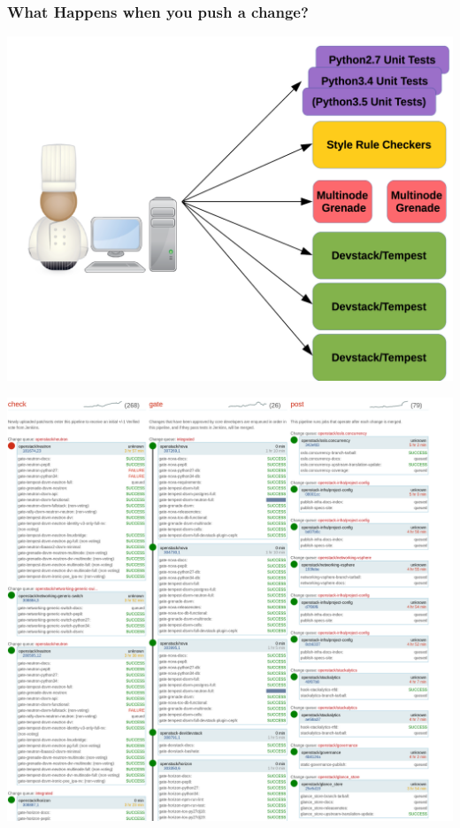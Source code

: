 \documentclass[aspectratio=169,11pt,hyperref={colorlinks=true}]{beamer}
\begin{document}
\begin{frame}
\frametitle{What Happens when you push a change?}
\begin{center}
	\includegraphics[width=.7\textwidth]{jobs.png}
\end{center}
\end{frame}

\begin{frame}
\begin{center}
    \includegraphics[width=.8\textwidth]{ZuulStatus.png}
\end{center}
\end{frame}
\end{document}
